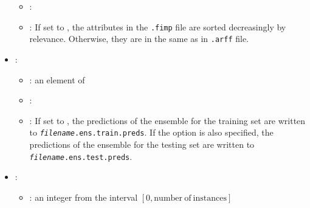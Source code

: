 \begin{itemize}
\begin{itemize}
                \item \optionDefaultValue{}: 
                \item \optionDescrption{}: If set to , the attributes in the \texttt{.fimp} file are sorted decreasingly by relevance. Otherwise, they are in the same as in \texttt{.arff} file.
           \end{itemize}
    \item {}:
           \begin{itemize}
                \item \optionPossibleValues{}: an element of 
                \item \optionDefaultValue{}: 
                \item \optionDescrption{}: If set to , the predictions of the ensemble for the training set are written to \texttt{{\em filename}.ens.train.preds}.
                If the option  is also specified,  the predictions of the ensemble for the testing set are written to \texttt{{\em filename}.ens.test.preds}.
           \end{itemize}
    \item {}:
           \begin{itemize}
                \item \optionPossibleValues{}: an integer from the interval $[0, \mathrm{number\ of\ instances}]$

\end{itemize}
\end{itemize}
